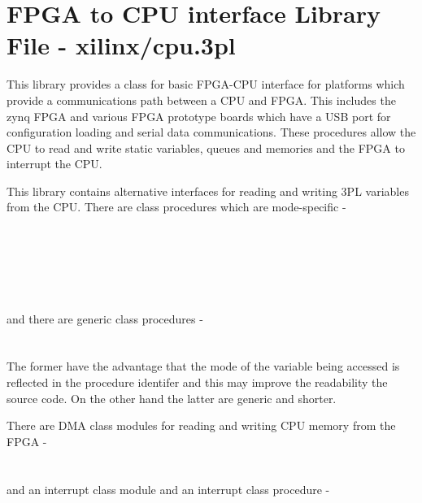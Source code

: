 \pagebreak

\section{FPGA to CPU interface Library File - xilinx/cpu.3pl}
\label{chap:lmxilcpulib}

    This library provides a class for basic FPGA-CPU interface for platforms
    which provide a communications path between a CPU and FPGA. This includes
    the zynq FPGA and various FPGA prototype boards which have a USB port for
    configuration loading and serial data communications. These procedures allow
    the CPU to read and write static variables, queues and memories and the FPGA
    to interrupt the CPU.
    
    This library contains alternative interfaces for reading and writing 3PL
    variables from the CPU. There are class procedures which are mode-specific - \\
            \hspace*{1cm}{\bf CPU\_API.read\_value()}\\
            \hspace*{1cm}{\bf CPU\_API.read\_queue()}\\
            \hspace*{1cm}{\bf CPU\_API.read\_memory()}\\
            \hspace*{1cm}{\bf CPU\_API.write\_static()}\\
            \hspace*{1cm}{\bf CPU\_API.write\_queue()}\\
            \hspace*{1cm}{\bf CPU\_API.write\_memory()}\\
    and there are generic class procedures - \\
            \hspace*{1cm}{\bf CPU\_API.read()}  \\          
            \hspace*{1cm}{\bf CPU\_API.write()}\\
    
    The former have the advantage that the mode of the variable being accessed
    is reflected in the procedure identifer and this may improve the readability
    the source code. On the other hand the latter are generic and shorter.
    
    There are DMA class modules for reading and writing CPU memory from the
    FPGA -\\
            \hspace*{1cm}{\bf CPU\_API.dma\_read()} \\
            \hspace*{1cm}{\bf CPU\_API.dma\_write()}\\
    and an interrupt class module and an interrupt class procedure -\\
            \hspace*{1cm}{\bf CPU\_API.sigint()}\\
            \hspace*{1cm}{\bf CPU\_API.interrupt()}\\
            

